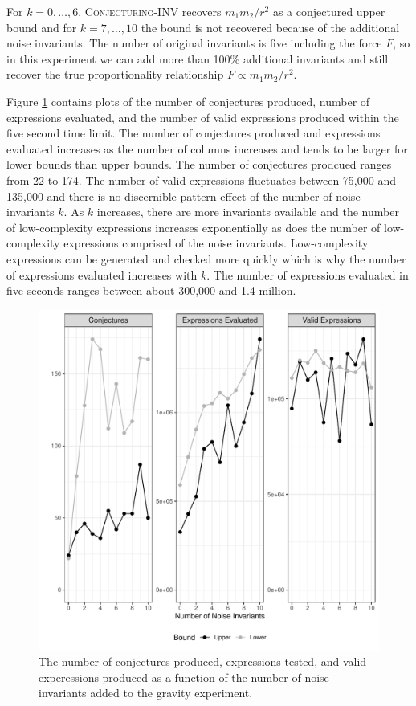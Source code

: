 \documentclass[ijds,nonblindrev]{informs-ijds}
\begin{document}
For $k=0, \ldots, 6$, \textsc{Conjecturing-INV} recovers $m_1m_2/r^2$ as a conjectured upper bound and for $k=7, \ldots, 10$ the bound is not recovered because of the additional noise invariants.  The number of original invariants is five including the force $F$, so in this experiment we can add more than 100\% additional invariants and still recover the true proportionality relationship $F \propto m_1m_2/r^2$.  

Figure \ref{noisetest} contains plots of the number of conjectures produced, number of expressions evaluated, and the number of valid expressions produced within the five second time limit.  The number of conjectures produced and expressions evaluated increases as the number of columns increases and tends to be larger for lower bounds than upper bounds.  The number of conjectures prodcued ranges from 22 to 174.  The number of valid expressions fluctuates between 75,000 and 135,000 and there is no discernible pattern effect of the number of noise invariants $k$.   As $k$ increases, there are more invariants available and the number of low-complexity expressions increases exponentially as does the number of low-complexity expressions comprised of the noise invariants.  Low-complexity expressions can be generated and checked more quickly which is why the number of expressions evaluated increases with $k$.  The number of expressions evaluated in five seconds ranges between about 300,000 and 1.4 million.      


\begin{figure}
\includegraphics[width=5.0in]{complexity_vs_m.pdf} 
\caption{\label{noisetest}The number of conjectures produced, expressions tested, and valid experessions produced as a function of the number of noise invariants added to the gravity experiment.} 
\end{figure}
\end{document}
